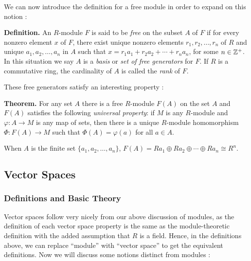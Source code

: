 \documentclass[11pt, reqno]{amsart}
\theoremstyle{plain}
\theoremstyle{definition}
\theoremstyle{example}
\begin{document}
\par
We can now introduce the definition for a free module in order to expand on this notion \cite[\S 10.3, p. 354]{dummit}:

\par
\textbf{Definition.} An $R$-module $F$ is said to be \textit{free} on the subset $A$ of $F$ if for every nonzero element $x$ of $F$, there exist unique nonzero elements $r_1, r_2, \ldots, r_n$ of $R$ and unique $a_1, a_2, \ldots, a_n$ in $A$ such that $x = r_1a_1 + r_2a_2 + \cdots + r_na_n$, for some $n \in \mathbb{Z}^+$. In this situation we say $A$ is a \textit{basis} or \textit{set of free generators} for $F$. If $R$ is a commutative ring, the cardinality of $A$ is called the \textit{rank} of $F$.

These free generators satisfy an interesting property \cite[\S 10.3, p. 354]{dummit}:

\par
\textbf{Theorem.} For any set $A$ there is a free $R$-module $F(A)$ on the set $A$ and $F(A)$ satisfies the following \textit{universal property}: if $M$ is any $R$-module and $\varphi: A \to M$ is any map of sets, then there is a unique $R$-module homomorphism $\Phi: F(A) \to M$ such that $\Phi(A) = \varphi(a)$ for all $a \in A$.

\par
When $A$ is the finite set $\{a_1, a_2, \ldots, a_n\}$, $F(A) = Ra_1 \oplus Ra_2 \oplus \cdots \oplus Ra_n \cong R^n$.


\subsection{Vector Spaces}


\subsubsection{Definitions and Basic Theory}

Vector spaces follow very nicely from our above discussion of modules, as the definition of each vector space property is the same as the module-theoretic definition with the added assumption that $R$ is a field. Hence, in the definitions above, we can replace ``module'' with ``vector space'' to get the equivalent definitions. Now we will discuss some notions distinct from modules \cite[\S 11.1, p. 409]{dummit}:
\end{document}
